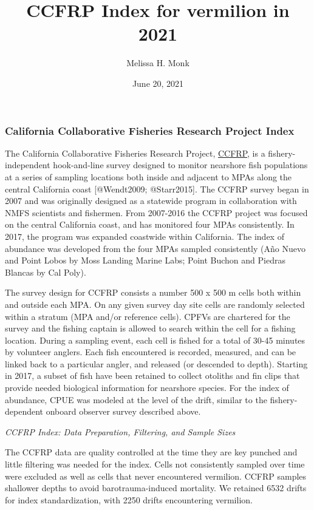 \documentclass[
]{article}
\title{CCFRP Index for vermilion in 2021}
\author{Melissa H. Monk}
\date{June 20, 2021}
\begin{document}
\maketitle

{
\setcounter{tocdepth}{2}
\tableofcontents
}
\hypertarget{california-collaborative-fisheries-research-project-index}{%
\subsubsection{California Collaborative Fisheries Research Project Index}\label{california-collaborative-fisheries-research-project-index}}

The California Collaborative Fisheries Research Project, \href{https://www.mlml.calstate.edu/ccfrp/}{CCFRP},
is a fishery-independent
hook-and-line survey designed to monitor nearshore fish populations at a series of sampling
locations both inside and adjacent to MPAs along the central California coast
{[}@Wendt2009; @Starr2015{]}. The CCFRP survey began in 2007 and was originally
designed as a statewide program in collaboration with NMFS scientists and fishermen.
From 2007-2016 the CCFRP project was focused on the central California coast, and has monitored
four MPAs consistently. In 2017,
the program was expanded coastwide within California. The index of abundance was
developed from the four MPAs sampled consistently (Año Nuevo and Point Lobos
by Moss Landing Marine Labs; Point Buchon and Piedras Blancas by Cal Poly).

The survey design for CCFRP consists a number 500 x 500 m cells both within and
outside each MPA. On any given survey day site cells are randomly
selected within a stratum (MPA and/or reference cells). CPFVs are chartered
for the survey and the fishing captain is allowed to search within the cell for
a fishing location. During a sampling event, each cell is fished for a total of
30-45 minutes by volunteer anglers. Each fish encountered is recorded, measured,
and can be linked back to a particular angler, and released (or descended to depth).
Starting in 2017, a subset of fish have been retained to collect otoliths and fin
clips that provide needed biological information for nearshore species. For the index of abundance, CPUE was modeled at the level of the drift, similar to the
fishery-dependent onboard observer survey described above.

\emph{CCFRP Index: Data Preparation, Filtering, and Sample Sizes}

The CCFRP data are quality controlled at the time they are key punched and little
filtering was needed for the index.
Cells not consistently sampled over time were excluded as well as cells that never encountered vermilion. CCFRP samples shallower
depths to avoid barotrauma-induced mortality. We retained 6532 drifts for index standardization, with 2250 drifts encountering vermilion.
\end{document}
